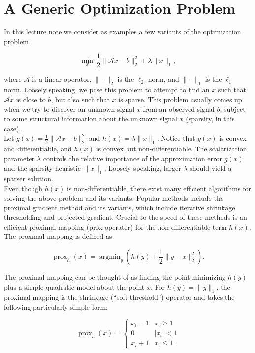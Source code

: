 \documentclass[journal]{IEEEtran}
\newcommand{\opn}[1]{\operatorname{#1}}
\begin{document}
\section{A Generic Optimization Problem}
In this lecture note we consider as examples a few variants of the optimization problem

\begin{equation}
\label{eq:model_problem}
\min_x ~\frac{1}{2}\|\mathcal{A}x-b\|_2^2 + \lambda \|x\|_1,
\end{equation}

\noindent where $\mathcal{A}$ is a linear operator, $\|\cdot\|_2$ is the $\ell_2$ norm, and $\|\cdot\|_1$ is the $\ell_1$ norm.  Loosely speaking, we pose this problem to attempt to find an $x$ such that $\mathcal{A}x$ is close to $b$, but also such that $x$ is sparse.  This problem usually comes up when we try to discover an unknown signal $x$ from an observed signal $b$, subject to some structural information about the unknown signal $x$ (sparsity, in this case).\\

\noindent Let $g(x) = \frac{1}{2}\|\mathcal{A}x-b\|_2^2$ and $h(x)=\lambda \|x\|_1$.  Notice that $g(x)$ is convex and differentiable, and $h(x)$ is convex but non-differentiable.  The scalarization parameter $\lambda$ controls the relative importance of the approximation error $g(x)$ and the sparsity heuristic $\|x\|_1$.  Loosely speaking, larger $\lambda$ should yield a sparser solution.\\

Even though $h(x)$ is non-differentiable, there exist many efficient algorithms for solving the above problem and its variants.  Popular methods include the proximal gradient method and its variants, which include iterative shrinkage thresholding and projected gradient.  Crucial to the speed of these methods is an efficient proximal mapping (prox-operator) for the non-differentiable term $h(x)$.  The proximal mapping is defined as

\[ \opn{prox}_h(x) = \opn{argmin}_{y} \left(h(y) + \dfrac{1}{2}\|y-x\|_2^2\right). \] 

\noindent The proximal mapping can be thought of as finding the point minimizing $h(y)$ plus a simple quadratic model about the point $x$.  For $h(y) = \|y\|_1$, the proximal mapping is the shrinkage (``soft-threshold'') operator and takes the following particularly simple form:

\[ \opn{prox}_h(x) = \left\{\begin{array}{ll} x_i - 1 & x_i \ge 1\\ 0 & |x_i| < 1\\ x_i + 1 & x_i \le 1.\end{array}\right. \]
\end{document}

